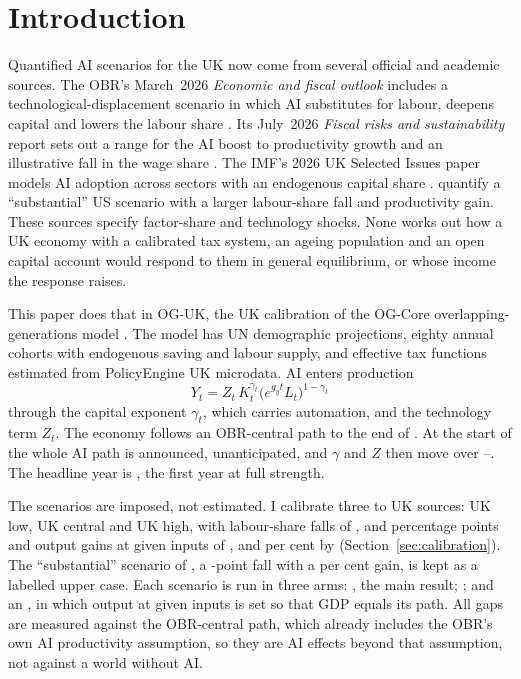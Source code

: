 \section{Introduction}
\label{sec:intro}

Quantified AI scenarios for the UK now come from several official and academic sources. The OBR's March~2026 \emph{Economic and fiscal outlook} includes a technological-displacement scenario in which AI substitutes for labour, deepens capital and lowers the labour share \citep[Box~2.2]{obr2026efo}. Its July~2026 \emph{Fiscal risks and sustainability} report sets out a range for the AI boost to productivity growth and an illustrative fall in the wage share \citep[Box~4.1]{obr2026frs}. The IMF's 2026 UK Selected Issues paper models AI adoption across sectors with an endogenous capital share \citep{imf2026sip}. \citet{korinek2026} quantify a ``substantial'' US scenario with a larger labour-share fall and productivity gain. These sources specify factor-share and technology shocks. None works out how a UK economy with a calibrated tax system, an ageing population and an open capital account would respond to them in general equilibrium, or whose income the response raises.

This paper does that in OG-UK, the UK calibration of the OG-Core overlapping-generations model \citep{ogcore,debacker2019pfr}. The model has UN demographic projections, eighty annual cohorts with endogenous saving and labour supply, and effective tax functions estimated from PolicyEngine UK microdata. AI enters production
\begin{equation}
\label{eq:production}
Y_t = Z_t\, K_t^{\gamma_t} \bigl(e^{g_y t} L_t\bigr)^{1-\gamma_t}
\end{equation}
through the capital exponent $\gamma_t$, which carries automation, and the technology term $Z_t$. The economy follows an OBR-central path to the end of \genRampZeroYear{}. At the start of \genShockYear{} the whole AI path is announced, unanticipated, and $\gamma$ and $Z$ then move over \genShockYear--\genHeadYear{}. The headline year is \genHeadYear{}, the first year at full strength.

The scenarios are imposed, not estimated. I calibrate three to UK sources: UK low, UK central and UK high, with labour-share falls of \genUkLowFallPp{}, \genUkCentralFallPp{} and \genUkHighFallPp{} percentage points and output gains at given inputs of \genUkLowTfpPct{}, \genUkCentralTfpPct{} and \genUkHighTfpPct{} per cent by \genHeadYear{} (Section~\ref{sec:calibration}). The ``substantial'' scenario of \citet{korinek2026}, a \genKorinekFallPp{}-point fall with a \genKorinekTfpPct{} per cent gain, is kept as a labelled upper case. Each scenario is run in three arms: \Main{}, the main result; \Flat{}; and an \Stress{}, in which output at given inputs is set so that \genHeadYear{} GDP equals its path. All gaps are measured against the OBR-central path, which already includes the OBR's own AI productivity assumption, so they are AI effects beyond that assumption, not against a world without AI.


